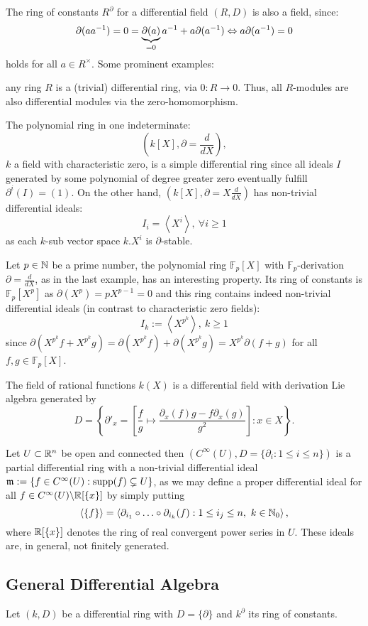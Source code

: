 \indent The ring of constants $R^\partial$ for a differential field $(R, D)$ is also a field, since:
$$\partial(a a^{-1}) = 0 = \underbrace{\partial(a)}_{=0} a^{-1} + a \partial(a^{-1}) \Leftrightarrow a \partial(a^{-1}) = 0$$
holds for all $a \in R^\times$.
\bsp Some prominent examples:
\bn
\item any ring $R$ is a (trivial) differential ring, via $0 : R \longrightarrow 0$. Thus, all $R$-modules are also differential modules via the zero-homomorphism.
\item The polynomial ring in one indeterminate:
$$\left(k[X], \partial = \frac{d}{dX}\right),$$
$k$ a field with characteristic zero, is a simple differential ring since all ideals $I$ generated by some polynomial of degree greater zero eventually fulfill $\partial^i(I) = (1)$. On the other hand, $(k[X], \partial = X \frac{d}{dX})$ has non-trivial differential ideals:
$$I_i = \left<X^i\right>,\ \forall i \geq 1$$
as each $k$-sub vector space $k.X^i$ is $\partial$-stable.
\item Let $p \in \mathbb{N}$ be a prime number, the polynomial ring $\mathbb{F}_p[X]$ with $\mathbb{F}_p$-derivation $\partial = \frac{d}{d X}$, as in the last example, has an interesting property. Its ring of constants is $\mathbb{F}_p[X^p]$ as $\partial(X^p) = p X^{p-1} = 0$ and this ring contains indeed non-trivial differential ideals (in contrast to characteristic zero fields):
$$I_k := \left<X^{p^k}\right>,\ k \geq 1$$%
since $\partial(X^{p^k} f + X^{p^k} g) = \partial(X^{p^k} f) + \partial(X^{p^k} g) = X^{p^k} \partial(f + g)$ for all $f, g \in \mathbb{F}_p[X]$.
\item The field of rational functions $k(X)$ is a differential field with derivation Lie algebra generated by
$$D = \left\{\partial'_x = \left[\frac{f}{g} \mapsto \frac{\partial_x(f) g - f \partial_x(g)}{g^2}\right] : x \in X\right\}.$$
\item Let $U \subset \mathbb{R}^n$ be open and connected then $(C^\infty(U),D=\{\partial_i : 1 \leq i \leq n\})$ is a partial differential ring with a non-trivial differential ideal $\mathfrak{m} := \{f \in C^\infty(U) : \mathrm{supp} (f) \subsetneq U\}$, as we may define a proper differential ideal for all $f \in C^\infty(U) \backslash \mathbb{R}[\{x\}]$ by simply putting
$$\left<\{f\}\right> = \left<\partial_{i_1} \circ \hdots \circ \partial_{i_k}(f) : 1\leq i_j \leq n,\ k \in \mathbb{N}_0\right>,$$
where $\mathbb{R}[\{x\}]$ denotes the ring of real convergent power series in $U$. These ideals are, in general, not finitely generated.
\en
\subsection{General Differential Algebra}
Let $(k,D)$ be a differential ring with $D = \{\partial\}$ and $k^\partial$ its ring of constants.

